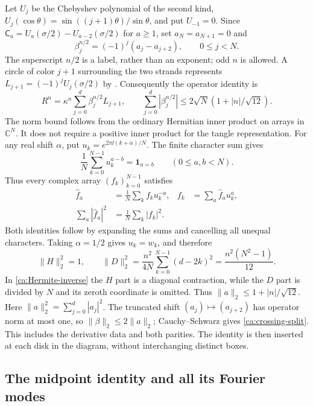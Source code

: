 Let $U_j$ be the Chebyshev polynomial of the second kind,
$U_j(\cos\theta)=\sin((j+1)\theta)/\sin\theta$, and put $U_{-1}=0$.
Since $\mathsf C_a=U_a(\sigma/2)-U_{a-2}(\sigma/2)$ for $a\ge1$,
set $a_N=a_{N+1}=0$ and
\begin{equation}\label{ca:beta}
 \beta_j^{n/2}=(-1)^j(a_j-a_{j+2}),\qquad0\le j<N.
\end{equation}
The superscript $n/2$ is a label, rather than an exponent; odd $n$
is allowed. A circle of color $j+1$ surrounding the two strands
represents $L_{j+1}=(-1)^jU_j(\sigma/2)$ by
\cite[Proposition 4.1]{Newton}. Consequently the operator identity is
\begin{equation}\label{ca:crossing-split}
 R^n=\kappa^n\sum_{j=0}^{d}\beta_j^{n/2}L_{j+1},
 \qquad
 \sum_{j=0}^{d}|\beta_j^{n/2}|
       \le 2\sqrt N(1+|n|/\sqrt{12}).
\end{equation}
The norm bound follows from the ordinary Hermitian inner product on
arrays in $\mathbb C^N$. It does not require a positive inner product
for the tangle representation. For any real shift $\alpha$,
put $u_k=e^{2\pi\ii(k+\alpha)/N}$. The finite character sum gives
\[
 \frac1N\sum_{k=0}^{N-1}u_k^{a-b}=\mathbf1_{a=b}
                    \qquad(0\le a,b<N).
\]
Thus every complex array $(f_k)_{k=0}^{N-1}$ satisfies
\begin{equation}\label{ca:shifted-parseval}
\begin{aligned}
 \widehat f_a&=\frac1N\sum_k f_ku_k^{-a},&
 f_k&=\sum_a\widehat f_a u_k^a,\\
 \sum_a|\widehat f_a|^2&=\frac1N\sum_k|f_k|^2.
\end{aligned}
\end{equation}
Both identities follow by expanding the sums and cancelling all unequal
characters. Taking $\alpha=1/2$ gives $u_k=w_k$, and therefore
\[
 \|H\|_2^2=1,\qquad
 \|D\|_2^2=\frac{n^2}{4N}\sum_{k=0}^{N-1}(d-2k)^2
           =\frac{n^2(N^2-1)}{12}.
\]
In \eqref{ca:Hermite-inverse} the $H$ part is a diagonal
contraction, while the $D$ part is divided by $N$ and its zeroth
coordinate is omitted. Thus
$\|a\|_2\le1+|n|/\sqrt{12}$. Here $\|a\|_2^2=\sum_{j=0}^d|a_j|^2$. The truncated shift
$(a_j)\mapsto(a_{j+2})$ has operator norm at most one, so
$\|\beta\|_2\le2\|a\|_2$; Cauchy--Schwarz gives
\eqref{ca:crossing-split}. This includes the derivative data and
both parities. The identity is then inserted at each disk in the
diagram, without interchanging distinct boxes.

\subsection{The midpoint identity and all its Fourier modes}

